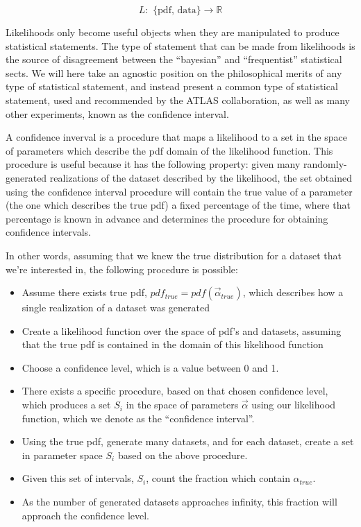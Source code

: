 \begin{equation}
L: \text{ \{pdf, data\} } \rightarrow \mathbb{R}
\end{equation}

Likelihoods only become useful objects when they are manipulated to produce statistical statements.
The type of statement that can be made from likelihoods is the source of disagreement between the ``bayesian'' and ``frequentist'' statistical sects.
We will here take an agnostic position on the philosophical merits of any type of statistical statement, and instead present a common type of statistical
statement, used and recommended by the ATLAS collaboration, as well as many other experiments, known as the confidence interval.

A confidence inverval is a procedure that maps a likelihood to a set in the space of parameters which describe the pdf domain of the likelihood function.
This procedure is useful because it has the following property: given many randomly-generated realizations of the dataset described by the likelihood, the
set obtained using the confidence interval procedure will contain the true value of a parameter (the one which describes the true pdf) a fixed percentage
of the time, where that percentage is known in advance and determines the procedure for obtaining confidence intervals.

In other words, assuming that we knew the true distribution for a dataset that we're interested in, the following procedure is possible:
\begin{itemize}
  \item Assume there exists true pdf, $pdf_{true} = pdf(\vec{\alpha}_{true})$, which describes how a single realization of a dataset was generated
  \item Create a likelihood function over the space of pdf's and datasets, assuming that the true pdf is contained in the domain of this likelihood function
  \item Choose a confidence level, which is a value between 0 and 1.
  \item There exists a specific procedure, based on that chosen confidence level, which produces a set $S_i$ in the space of parameters $\vec{\alpha}$ using our likelihood function, which we denote as the ``confidence interval''.  
  \item Using the true pdf, generate many datasets, and for each dataset, create a set in parameter space $S_i$ based on the above procedure.
  \item Given this set of intervals, {$S_i$}, count the fraction which contain $\alpha_{true}$.
  \item As the number of generated datasets approaches infinity, this fraction will approach the confidence level.
\end{itemize}


